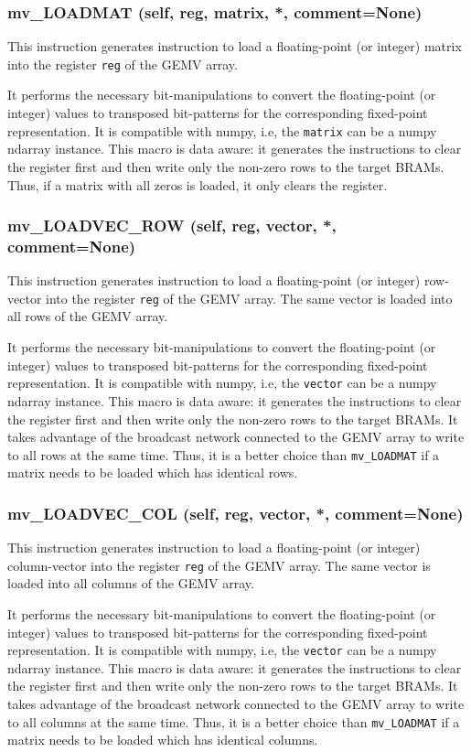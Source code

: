 \documentclass{article}
\begin{document}
\subsubsection*{mv\_LOADMAT (self, reg, matrix, *, comment=None)}
This instruction generates instruction to load a floating-point (or integer)
matrix into the register \texttt{reg} of the GEMV array.

It performs the necessary bit-manipulations to convert the floating-point (or integer)
values to transposed bit-patterns for the corresponding fixed-point representation.
It is compatible with numpy, i.e, the \texttt{matrix} can be a numpy ndarray instance.
This macro is data aware: it generates the instructions to clear the register
first and then write only the non-zero rows to the target BRAMs.
Thus, if a matrix with all zeros is loaded, it only clears the register.


\subsubsection*{mv\_LOADVEC\_ROW (self, reg, vector, *, comment=None)}
This instruction generates instruction to load a floating-point (or integer)
row-vector into the register \texttt{reg} of the GEMV array.
The same vector is loaded into all rows of the GEMV array.

It performs the necessary bit-manipulations to convert the floating-point (or integer)
values to transposed bit-patterns for the corresponding fixed-point representation.
It is compatible with numpy, i.e, the \texttt{vector} can be a numpy ndarray instance.
This macro is data aware: it generates the instructions to clear the register
first and then write only the non-zero rows to the target BRAMs.
It takes advantage of the broadcast network connected to the GEMV array to 
write to all rows at the same time.
Thus, it is a better choice than \texttt{mv\_LOADMAT} if a matrix needs to be
loaded which has identical rows.



\subsubsection*{mv\_LOADVEC\_COL (self, reg, vector, *, comment=None)}
This instruction generates instruction to load a floating-point (or integer)
column-vector into the register \texttt{reg} of the GEMV array.
The same vector is loaded into all columns of the GEMV array.

It performs the necessary bit-manipulations to convert the floating-point (or integer)
values to transposed bit-patterns for the corresponding fixed-point representation.
It is compatible with numpy, i.e, the \texttt{vector} can be a numpy ndarray instance.
This macro is data aware: it generates the instructions to clear the register
first and then write only the non-zero rows to the target BRAMs.
It takes advantage of the broadcast network connected to the GEMV array to 
write to all columns at the same time.
Thus, it is a better choice than \texttt{mv\_LOADMAT} if a matrix needs to be
loaded which has identical columns.
\end{document}
